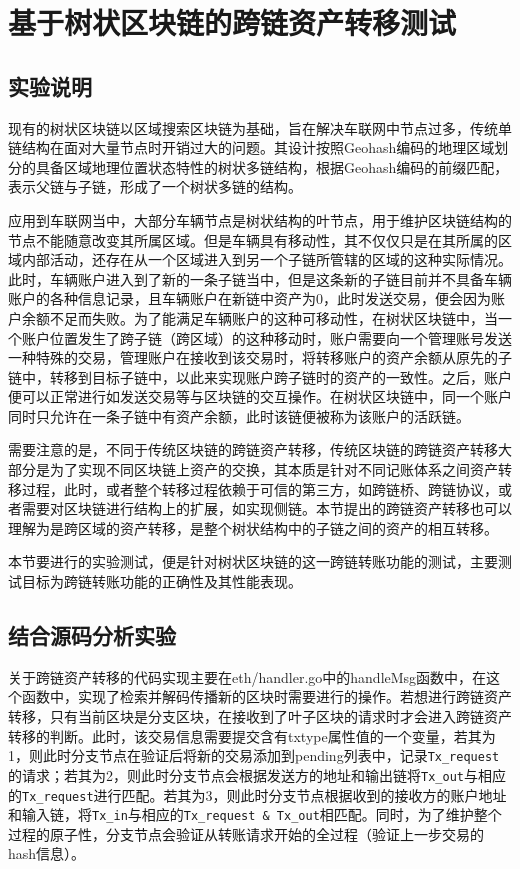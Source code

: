 
\chapter{基于树状区块链的跨链资产转移测试}

\section{实验说明}

现有的树状区块链以区域搜索区块链为基础，旨在解决车联网中节点过多，传统单链结构在面对大量节点时开销过大的问题。其设计按照Geohash编码的地理区域划分的具备区域地理位置状态特性的树状多链结构，根据Geohash编码的前缀匹配，表示父链与子链，形成了一个树状多链的结构。

应用到车联网当中，大部分车辆节点是树状结构的叶节点，用于维护区块链结构的节点不能随意改变其所属区域。但是车辆具有移动性，其不仅仅只是在其所属的区域内部活动，还存在从一个区域进入到另一个子链所管辖的区域的这种实际情况。此时，车辆账户进入到了新的一条子链当中，但是这条新的子链目前并不具备车辆账户的各种信息记录，且车辆账户在新链中资产为0，此时发送交易，便会因为账户余额不足而失败。为了能满足车辆账户的这种可移动性，在树状区块链中，当一个账户位置发生了跨子链（跨区域）的这种移动时，账户需要向一个管理账号发送一种特殊的交易，管理账户在接收到该交易时，将转移账户的资产余额从原先的子链中，转移到目标子链中，以此来实现账户跨子链时的资产的一致性。之后，账户便可以正常进行如发送交易等与区块链的交互操作。在树状区块链中，同一个账户同时只允许在一条子链中有资产余额，此时该链便被称为该账户的活跃链。

需要注意的是，不同于传统区块链的跨链资产转移，传统区块链的跨链资产转移大部分是为了实现不同区块链上资产的交换，其本质是针对不同记账体系之间资产转移过程，此时，或者整个转移过程依赖于可信的第三方，如跨链桥、跨链协议，或者需要对区块链进行结构上的扩展，如实现侧链。本节提出的跨链资产转移也可以理解为是跨区域的资产转移，是整个树状结构中的子链之间的资产的相互转移。

本节要进行的实验测试，便是针对树状区块链的这一跨链转账功能的测试，主要测试目标为跨链转账功能的正确性及其性能表现。

\section{结合源码分析实验}

关于跨链资产转移的代码实现主要在eth/handler.go中的handleMsg函数中，在这个函数中，实现了检索并解码传播新的区块时需要进行的操作。若想进行跨链资产转移，只有当前区块是分支区块，在接收到了叶子区块的请求时才会进入跨链资产转移的判断。此时，该交易信息需要提交含有txtype属性值的一个变量，若其为1，则此时分支节点在验证后将新的交易添加到pending列表中，记录\verb|Tx_request|的请求；若其为2，则此时分支节点会根据发送方的地址和输出链将\verb|Tx_out|与相应的\verb|Tx_request|进行匹配。若其为3，则此时分支节点根据收到的接收方的账户地址和输入链，将\verb|Tx_in|与相应的\verb|Tx_request & Tx_out|相匹配。同时，为了维护整个过程的原子性，分支节点会验证从转账请求开始的全过程（验证上一步交易的hash信息）。

